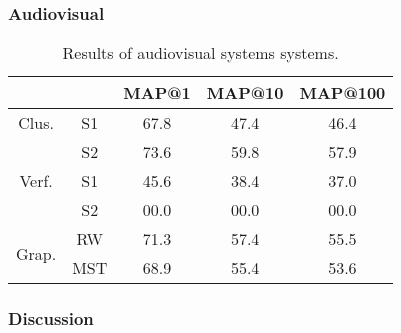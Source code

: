 \subsubsection{Audiovisual}

\begin{table}[tb]
\centering
\begin{tabular}{|c|c|c|c|c|}
\cline{3-5}
 \multicolumn{2}{c|}{ }	& MAP@1 & MAP@10 & MAP@100  \\ \hline
 \multirow{1}{*}{Clus.} & S1	& 67.8   & 47.4   & 46.4 \\ \cline{2-5}
 						& S2 	& 73.6   & 59.8   & 57.9 \\ \hline
 						
 \multirow{1}{*}{Verf.} & S1	& 45.6   & 38.4   & 37.0\\ \cline{2-5}
 						& S2 	& 00.0   & 00.0   & 00.0 \\ \hline

 \multirow{2}{*}{Grap.} & RW 	& 71.3   &  57.4  & 55.5 \\ \cline{2-5}
 						& MST 	& 68.9   &  55.4  & 53.6 \\ \hline 								
\end{tabular}
\vspace*{-2mm}
\caption{Results of audiovisual systems systems.}
\vspace*{-2mm}
\label{tab:av_result}
\end{table}

\subsubsection{Discussion}

\endinput
